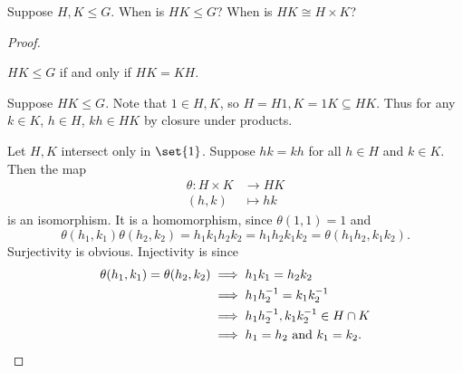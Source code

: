 \begin{exercise} \label{thm:products}
    Suppose $H, K \le G$.
    When is $HK \le G$?
    When is $HK \cong H \times K$?
\end{exercise}
\begin{proof}
    \begin{claim}
        $HK \le G$ if and only if $HK = KH$.
    \end{claim}
    \begin{subproof}
        Suppose $HK \le G$.
        Note that $1 \in H, K$, so $H = H1, K = 1K \subseteq HK$.
        Thus for any $k \in K$, $h \in H$,
        $kh \in HK$ by closure under products.

    \end{subproof}

    Let $H, K$ intersect only in $\set{1}$.
    Suppose $hk = kh$ for all $h \in H$ and $k \in K$.
    Then the map \begin{align*}
        \theta\colon H \times K &\to HK \\
        (h, k) &\mapsto hk
    \end{align*} is an isomorphism.
    It is a homomorphism, since $\theta(1, 1) = 1$ and \[
        \theta(h_1, k_1)\theta(h_2, k_2)
            = h_1k_1h_2k_2
            = h_1h_2k_1k_2
            = \theta(h_1h_2, k_1k_2).
    \] Surjectivity is obvious.
    Injectivity is since \begin{align*}
        \theta(h_1, k_1) = \theta(h_2, k_2)
            &\implies h_1k_1 = h_2k_2 \\
            &\implies h_1 h_2^{-1} = k_1 k_2^{-1} \\
            &\implies h_1 h_2^{-1}, k_1 k_2^{-1} \in H \cap K \\
            &\implies h_1 = h_2 \text{ and } k_1 = k_2. \qedhere
    \end{align*}
\end{proof}
